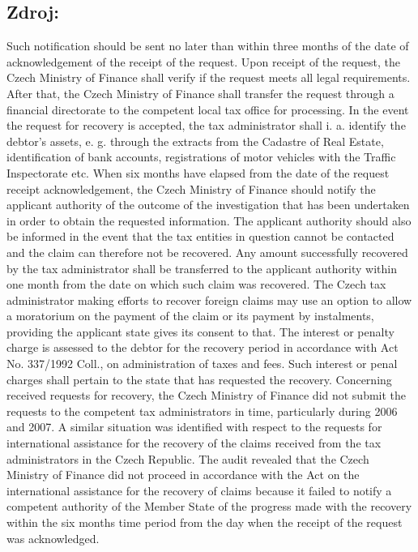 \documentclass[10pt]{article}
\begin{document}
\subsection*{Zdroj:}

Such notification should be sent no later than within three months of the date of acknowledgement of the receipt of the request.
Upon receipt of the request, the Czech Ministry of Finance shall verify if the request meets all legal requirements. After that, the Czech Ministry of Finance shall transfer the request through a financial directorate to the competent local tax office for processing.
In the event the request for recovery is accepted, the tax administrator shall i. a. identify the debtor's assets, e. g. through the extracts from the Cadastre of Real Estate, identification of bank accounts, registrations of motor vehicles with the Traffic Inspectorate etc.
When six months have elapsed from the date of the request receipt acknowledgement, the Czech Ministry of Finance should notify the applicant authority of the outcome of the investigation that has been undertaken in order to obtain the requested information.
The applicant authority should also be informed in the event that the tax entities in question cannot be contacted and the claim can therefore not be recovered.
Any amount successfully recovered by the tax administrator shall be transferred to the applicant authority within one month from the date on which such claim was recovered.
The Czech tax administrator making efforts to recover foreign claims may use an option to allow a moratorium on the payment of the claim or its payment by instalments, providing the applicant state gives its consent to that.
The interest or penalty charge is assessed to the debtor for the recovery period in accordance with Act No. 337/1992 Coll., on administration of taxes and fees.
Such interest or penal charges shall pertain to the state that has requested the recovery.
Concerning received requests for recovery, the Czech Ministry of Finance did not submit the requests to the competent tax administrators in time, particularly during 2006 and 2007.
A similar situation was identified with respect to the requests for international assistance for the recovery of the claims received from the tax administrators in the Czech Republic.
The audit revealed that the Czech Ministry of Finance did not proceed in accordance with the Act on the international assistance for the recovery of claims because it failed to notify a competent authority of the Member State of the progress made with the recovery within the six months time period from the day when the receipt of the request was acknowledged.
\end{document}
